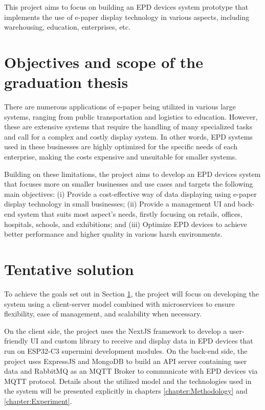 \documentclass[../Main.tex]{subfiles}
\begin{document}
This project aims to focus on building an \gls{EPD} devices system prototype that implements the use of e-paper display technology in various aspects, including warehousing, education, enterprises, etc.

\section{Objectives and scope of the graduation thesis}
\label{section:1.2}
There are numerous applications of e-paper being utilized in various large systems, ranging from public transportation and logistics to education. However, these are extensive systems that require the handling of many specialized tasks and call for a complex and costly display system. In other words, \gls{EPD} systems used in these businesses are highly optimized for the specific needs of each enterprise, making the costs expensive and unsuitable for smaller systems.

Building on these limitations, the project aims to develop an \gls{EPD} devices system that focuses more on smaller businesses and use cases and targets the following main objectives: (i) Provide a cost-effective way of data displaying using e-paper display technology in small businesses; (ii) Provide a management UI and back-end system that suits most aspect's needs, firstly focusing on retails, offices, hospitals, schools, and exhibitions; and (iii) Optimize \gls{EPD} devices to achieve better performance and higher quality in various harsh environments.

\section{Tentative solution}
\label{section:1.3}
To achieve the goals set out in Section \ref{section:1.2}, the project will focus on developing the system using a client-server model combined with microservices to ensure flexibility, ease of management, and scalability when necessary. 

On the client side, the project uses the NextJS framework to develop a user-friendly UI and custom library to receive and display data in \gls{EPD} devices that run on ESP32-C3 supermini development modules. On the back-end side, the project uses ExpressJS and MongoDB to build an API server containing user data and RabbitMQ as an MQTT Broker to communicate with \gls{EPD} devices via MQTT protocol. Details about the utilized model and the technologies used in the system will be presented explicitly in chapters \ref{chapter:Methodology} and \ref{chapter:Experiment}.
\end{document}
